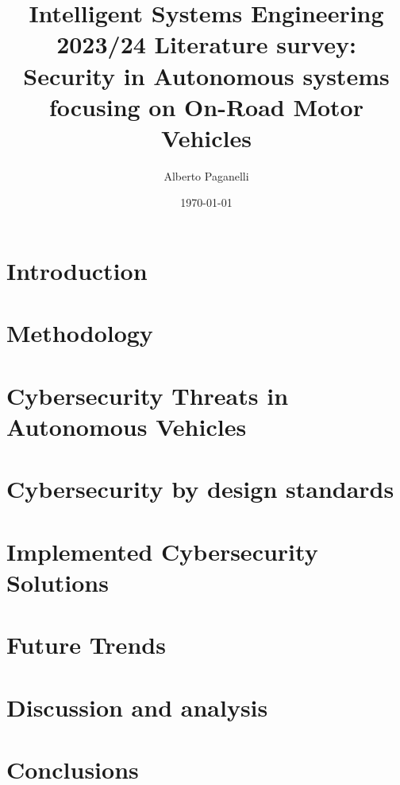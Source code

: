 \documentclass{scrartcl}
\title{\LARGE
Intelligent Systems Engineering 2023/24 \newline
\newline
Literature survey: \\
Security in Autonomous systems focusing on On-Road Motor Vehicles
}
\author{
    Alberto Paganelli \\ \emailaddr{alberto.paganelli3@studio.unibo.it}
}
\date{\today}
\begin{document}
    \maketitle
    \begin{abstract}
    
    \end{abstract}

    \newpage
    \tableofcontents
    \newpage

    \section{Introduction}\label{sec:introduction}
    
    \section{Methodology}\label{sec:methodology}
    

    \section{Cybersecurity Threats in Autonomous Vehicles}\label{sec:cybersecurity-threats-in-autonomous-vehicles}
    

    \section{Cybersecurity by design standards}\label{sec:cybersecurity-by-design-standards}
    

    \section{Implemented Cybersecurity Solutions}\label{sec:implemented-cybersecurity-solutions}
    

    \section{Future Trends}\label{sec:future-trends}
    

    \section{Discussion and analysis}\label{sec:discussion-and-analysis}
    

    \section{Conclusions}\label{sec:conclusions}
    

    ~\nocite{*}
    
    
\end{document}
